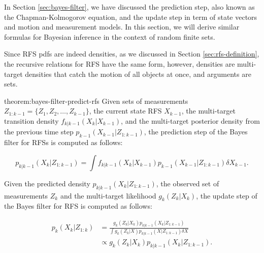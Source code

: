 In Section \ref{sec:bayes-filter}, we have discussed the prediction step, also known as the Chapman-Kolmogorov equation, and the update step in term of state vectors and motion and measurement models. In this section, we will derive similar formulas for Bayesian inference in the context of random finite sets.

Since RFS pdfs are indeed densities, as we discussed in Section \ref{sec:rfs-definition}, the recursive relations for RFS have the same form, however, densities are multi-target densities that catch the motion of all objects at once, and arguments are sets.

\begin{theorem}{theorem:bayes-filter-predict-rfs}
    Given sets of measurements $Z_{1:k-1} = \{Z_1,\allowbreak Z_2, \ldots, Z_{k-1}\}$, the current state RFS $X_{k-1}$, the multi-target transition density $f_{k|k-1}(X_k | X_{k-1})$, and the multi-target posterior density from the previous time step $p_{k-1}\left({X}_{k-1} | {Z}_{1:k-1}\right)$, the prediction step of the Bayes filter for RFSs is computed as follows:

    \begin{equation}
        p_{k|k-1}\left({X}_k | {Z}_{1:k-1}\right)
        = \int
            f_{k|k-1}\left( {X}_k | {X}_{k-1} \right)
            p_{k-1}\left( {X}_{k-1} | {Z}_{1: k-1} \right)
            \delta {X}_{k-1}.
    \end{equation}
\end{theorem}

\begin{theorem}\label{theorem:bayes-filter-update-rfs}
    Given the predicted density $p_{k|k-1}\left({X}_k | {Z}_{1:k-1}\right)$, the observed set of measurements $Z_k$ and the multi-target likelihood $g_k(Z_k | X_k)$, the update step of the Bayes filter for RFS is computed as follows:
    
    \begin{align}
        p_{k}\left({X}_k | {Z}_{1: k}\right)
        &= \frac{
            g_k\left({Z}_k | {X}_k\right) p_{k|k-1}\left({X}_k | {Z}_{1: k-1}\right)
        }{
            \int g_k\left({Z}_k | X\right) p_{k|k-1}\left(X | {Z}_{1: k-1}\right) \delta X
        } \\
        &\propto g_k\left({Z}_k | {X}_k\right) p_{k|k-1}\left({X}_k | {Z}_{1: k-1}\right).
    \end{align}
\end{theorem}

